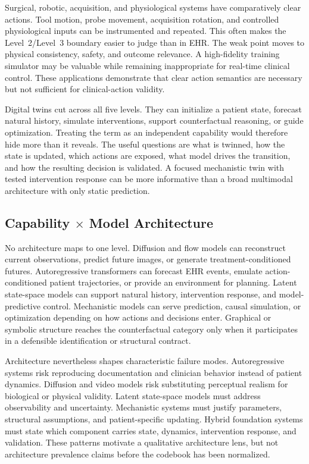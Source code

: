 Surgical, robotic, acquisition, and physiological systems have comparatively clear actions. Tool motion, probe movement, acquisition rotation, and controlled physiological inputs can be instrumented and repeated. This often makes the Level~2/Level~3 boundary easier to judge than in EHR. The weak point moves to physical consistency, safety, and outcome relevance. A high-fidelity training simulator may be valuable while remaining inappropriate for real-time clinical control. These applications demonstrate that clear action semantics are necessary but not sufficient for clinical-action validity.

Digital twins cut across all five levels. They can initialize a patient state, forecast natural history, simulate interventions, support counterfactual reasoning, or guide optimization. Treating the term as an independent capability would therefore hide more than it reveals. The useful questions are what is twinned, how the state is updated, which actions are exposed, what model drives the transition, and how the resulting decision is validated. A focused mechanistic twin with tested intervention response can be more informative than a broad multimodal architecture with only static prediction.

\subsection{Capability $\times$ Model Architecture}

No architecture maps to one level. Diffusion and flow models can reconstruct current observations, predict future images, or generate treatment-conditioned futures. Autoregressive transformers can forecast EHR events, emulate action-conditioned patient trajectories, or provide an environment for planning. Latent state-space models can support natural history, intervention response, and model-predictive control. Mechanistic models can serve prediction, causal simulation, or optimization depending on how actions and decisions enter. Graphical or symbolic structure reaches the counterfactual category only when it participates in a defensible identification or structural contract.

Architecture nevertheless shapes characteristic failure modes. Autoregressive systems risk reproducing documentation and clinician behavior instead of patient dynamics. Diffusion and video models risk substituting perceptual realism for biological or physical validity. Latent state-space models must address observability and uncertainty. Mechanistic systems must justify parameters, structural assumptions, and patient-specific updating. Hybrid foundation systems must state which component carries state, dynamics, intervention response, and validation. These patterns motivate a qualitative architecture lens, but not architecture prevalence claims before the codebook has been normalized.

